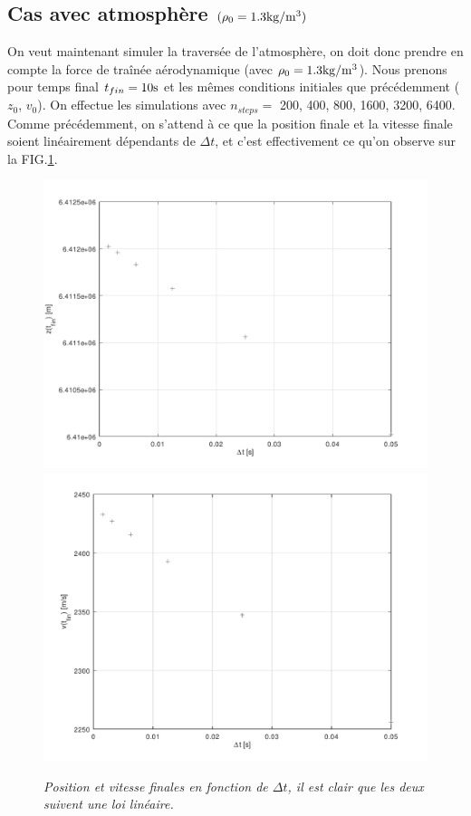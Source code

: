 \documentclass[a4paper,12pt,twoside]{article}
\begin{document}
\subsection{Cas avec atmosphère $(\rho_0=1.3 \rm kg/m^3)$}
On veut maintenant simuler la traversée de l'atmosphère, on doit donc prendre en compte la force de traînée aérodynamique  (avec $\rho_0 =1.3 \rm kg/m^3$). Nous prenons pour temps final $t_{fin}=10 \rm s$ et les mêmes conditions initiales que précédemment ($z_0$, $v_0$). On effectue les simulations avec $n_{steps}=$ 200, 400, 800, 1600, 3200, 6400. Comme précédemment, on s'attend à ce que la position finale et la vitesse finale soient linéairement dépendants de $\Delta t$, et c'est effectivement ce qu'on observe sur la FIG.\ref{convAvec}.
\begin{figure} %
\begin{center}
\includegraphics[width=0.49 \textwidth]{../q1_3_b/convPavec}
\includegraphics[width=0.49 \textwidth]{../q1_3_b/convVavec}
\end{center}
\caption{\em \label{convAvec} Position et vitesse finales en fonction de $\Delta t$, il est clair que les deux suivent une loi linéaire.}
\end{figure} %
\end{document}
